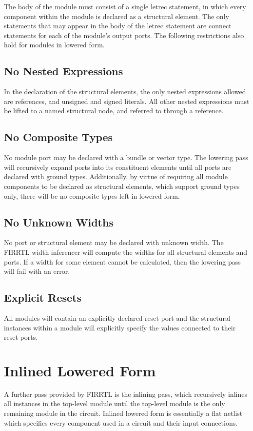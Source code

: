 \documentclass[12pt]{article}
\begin{document}
The body of the module must consist of a single letrec statement, in which every component within the module is declared as a structural element.
The only statements that may appear in the body of the letrec statement are connect statements for each of the module's output ports.
The following restrictions also hold for modules in lowered form.

\subsection{No Nested Expressions}
In the declaration of the structural elements, the only nested expressions allowed are references, and unsigned and signed literals.
All other nested expressions must be lifted to a named structural node, and referred to through a reference. 

\subsection{No Composite Types}
No module port may be declared with a bundle or vector type.
The lowering pass will recursively expand ports into its constituent elements until all ports are declared with ground types.
Additionally, by virtue of requiring all module components to be declared as structural elements, which support ground types only, there will be no composite types left in lowered form.

\subsection{No Unknown Widths}
No port or structural element may be declared with unknown width.
The FIRRTL width inferencer will compute the widths for all structural elements and ports.
If a width for some element cannot be calculated, then the lowering pass will fail with an error.

\subsection{Explicit Resets}
All modules will contain an explicitly declared reset port and the structural instances within a module will explicitly specify the values connected to their reset ports.


\section{Inlined Lowered Form}
A further pass provided by FIRRTL is the inlining pass, which recursively inlines all instances in the top-level module until the top-level module is the only remaining module in the circuit.
Inlined lowered form is essentially a flat netlist which specifies every component used in a circuit and their input connections. 
\end{document}
